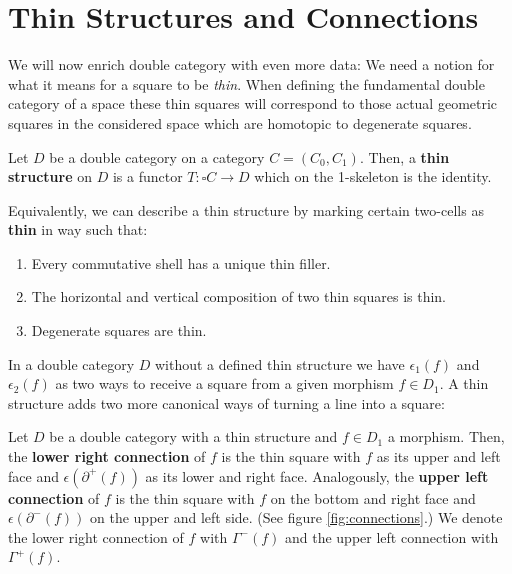 \section{Thin Structures and Connections}

We will now enrich double category with even more data: We need a notion for
what it means for a square to be \emph{thin}. When defining the fundamental double
category of a space these thin squares will correspond to those actual geometric
squares in the considered space which are homotopic to degenerate squares.

\begin{defn} \label{def:thin-structure}
Let $D$ be a double category on a category $C = (C_0, C_1)$. Then, a \textbf{thin
structure} on $D$ is a functor $T : \square C \to D$ which on the 1-skeleton is the
identity.

Equivalently, we can describe a thin structure by marking certain two-cells as
\textbf{thin} in way such that:
\begin{enumerate}
\item Every commutative shell has a unique thin filler.
\item The horizontal and vertical composition of two thin squares is thin.
\item Degenerate squares are thin.
\end{enumerate}
\end{defn}

In a double category $D$ without a defined thin structure we have
$\epsilon_1(f)$ and $\epsilon_2(f)$ as two ways to receive a square from a given
morphism $f \in D_1$. A thin structure adds two more canonical ways of turning
a line into a square:

\begin{defn} \label{def:connections}
Let $D$ be a double category with a thin structure and $f \in D_1$ a morphism.
Then, the \textbf{lower right connection} of $f$ is the thin square with $f$ 
as its upper and left face and $\epsilon(\partial^+(f))$ as its lower and right face.
Analogously, the \textbf{upper left connection} of $f$ is the thin square with
$f$ on the bottom and right face and $\epsilon(\partial^-(f))$ on the upper and
left side. (See figure \ref{fig:connections}.)
We denote the lower right connection of $f$ with $\Gamma^-(f)$ and the upper left
connection with $\Gamma^+(f)$.
\end{defn}

